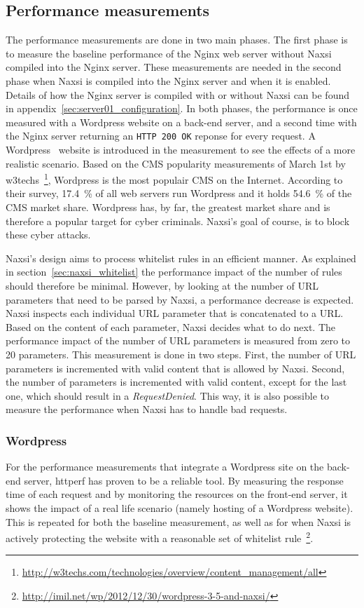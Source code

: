 \documentclass[Methods]{subfiles}
\begin{document}
\subsection{Performance measurements}
The performance measurements are done in two main phases. The first phase is to measure the baseline performance of the Nginx web server without Naxsi compiled into the Nginx server. These measurements are needed in the second phase when Naxsi is compiled into the Nginx server and when it is enabled. Details of how the Nginx server is compiled with or without Naxsi can be found in appendix~\ref{sec:server01_configuration}. In both phases, the performance is once measured with a Wordpress website on a back-end server, and a second time with the Nginx server returning an \verb+HTTP 200 OK+ reponse for every request. A Wordpress~\cite{wordpress} website is introduced in the measurement to see the effects of a more realistic scenario. Based on the \ac{CMS} popularity measurements of March 1st by w3techs~\footnote{\url{http://w3techs.com/technologies/overview/content_management/all}}, Wordpress is the most populair \ac{CMS} on the Internet. According to their survey, 17.4~\% of all web servers run Wordpress and it holds 54.6~\% of the CMS market share. Wordpress has, by far, the greatest market share and is therefore a popular target for cyber criminals. Naxsi's goal of course, is to block these cyber attacks.

Naxsi's design aims to process whitelist rules in an efficient manner. As explained in section~\ref{sec:naxsi_whitelist} the performance impact of the number of rules should therefore be minimal. However, by looking at the number of \ac{URL} parameters that need to be parsed by Naxsi, a performance decrease is expected. Naxsi inspects each individual \ac{URL} parameter that is concatenated to a \ac{URL}. Based on the content of each parameter, Naxsi decides what to do next. The performance impact of the number of \ac{URL} parameters is measured from zero to 20 parameters. This measurement is done in two steps. First, the number of \ac{URL} parameters is incremented with valid content that is allowed by Naxsi. Second, the number of parameters is incremented with valid content, except for the last one, which should result in a \textit{RequestDenied}. This way, it is also possible to measure the performance when Naxsi has to handle bad requests.

\subsubsection{Wordpress}
For the performance measurements that integrate a Wordpress site on the back-end server, httperf has proven to be a reliable tool. By measuring the response time of each request and by monitoring the resources on the front-end server, it shows the impact of a real life scenario (namely hosting of a Wordpress website). This is repeated for both the baseline measurement, as well as for when Naxsi is actively protecting the website with a reasonable set of whitelist rule~\footnote{\url{http://imil.net/wp/2012/12/30/wordpress-3-5-and-naxsi/}}.
\end{document}
